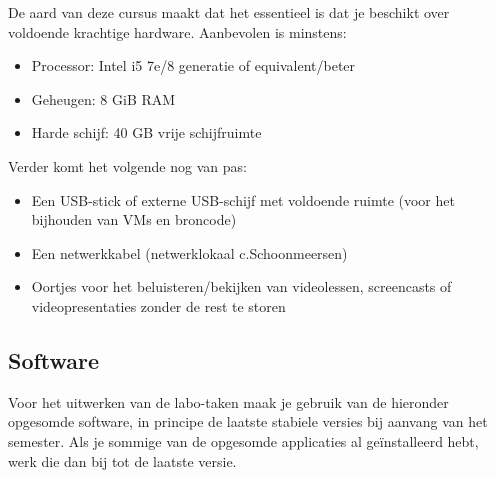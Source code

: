 De aard van deze cursus maakt dat het essentieel is dat je beschikt over voldoende krachtige hardware. Aanbevolen is minstens:

\begin{itemize}
  \item Processor: Intel i5 7e/8 generatie of equivalent/beter
  \item Geheugen: 8 GiB RAM
  \item Harde schijf: 40 GB vrije schijfruimte
\end{itemize}

Verder komt het volgende nog van pas:

\begin{itemize}
  \item Een USB-stick of externe USB-schijf met voldoende ruimte (voor het bijhouden van VMs en broncode)
  \item Een netwerkkabel (netwerklokaal c.Schoonmeersen)
  \item Oortjes voor het beluisteren/bekijken van videolessen, screencasts of videopresentaties zonder de rest te storen
\end{itemize}

\subsection{Software}
\label{ssec:software}

Voor het uitwerken van de labo-taken maak je gebruik van de hieronder opgesomde software, in principe de laatste stabiele versies bij aanvang van het semester. Als je sommige van de opgesomde applicaties al geïnstalleerd hebt, werk die dan bij tot de laatste versie.

